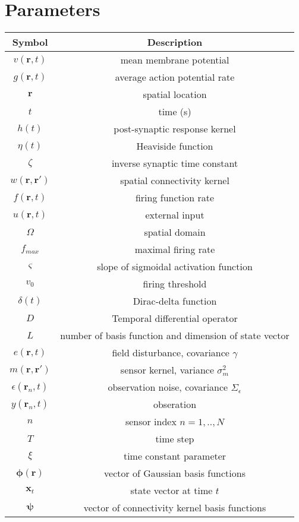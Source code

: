 \documentclass[12pt]{iopart}		%
\begin{document}
\section{Parameters}
\begin{tabular} {c|c} 
	\hline\hline
	Symbol & Description \\ \hline
	$v(\mathbf{r},t)$ & mean membrane potential \\
	$g(\mathbf{r},t)$ & average action potential rate \\
	$\mathbf{r}$ & spatial location \\
	$t$ & time (s) \\
	$h(t)$ & post-synaptic response kernel \\
	$\eta(t)$ & Heaviside function \\
	$\zeta$ & inverse synaptic time constant \\
	$w(\mathbf{r},\mathbf{r}')$ & spatial connectivity kernel \\
	$f(\mathbf{r},t)$ & firing function rate \\
	$u(\mathbf{r},t)$ & external input \\
	$\Omega$ & spatial domain \\
	$f_{max}$ & maximal firing rate \\
	$\varsigma$ & slope of sigmoidal activation function \\
	$v_0$ & firing threshold \\
	$\delta(t)$ & Dirac-delta function \\
	$D$ & Temporal differential operator \\
	$L$ & number of basis function and dimension of state vector \\
	$e(\mathbf{r},t)$ & field disturbance, covariance $\gamma$\\
	$m(\mathbf{r},\mathbf{r}')$ & sensor kernel, variance $\sigma_m^2$ \\
	$\epsilon(\mathbf{r}_n,t)$ & observation noise, covariance $\Sigma_\epsilon$ \\
	$y(\mathbf{r}_n,t)$ & obseration \\
	$n$ & sensor index $n=1,..,N$ \\
	$T$ & time step \\
	$\xi$ & time constant parameter \\
	$\mathbf{\phi(r)}$ & vector of Gaussian basis functions \\
	$\mathbf{x}_t$ & state vector at time $t$ \\
	$\mathbf{\psi}$ & vector of connectivity kernel basis functions \\

\end{tabular}
\end{document}
